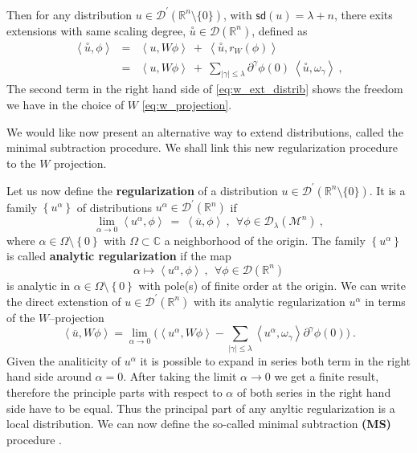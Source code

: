 \documentclass[11pt]{book}
\newcommand{\sd}{\mathsf{sd}}
\newcommand{\abs}[1]{\left|#1\right|}
\newcommand{\sm}[1]{\left\langle#1\right\rangle}
\newcommand{\exte}[1]{\overset{\circ}{#1}}
\newcommand{\Dcal}{\mathcal{D}}
\newcommand{\Mcal}{\mathcal{M}}
\newcommand{\Rbb}{\mathbb{R}}
\theoremstyle{break}
\begin{document}
Then for any distribution $u\in\Dcal^\prime(\Rbb^n\setminus\{0\})$, with $\sd(u) = \lambda +n$, there exits extensions with same scaling degree, $\exte{u} \in \Dcal(\Rbb^n)$, defined as
% 
\begin{eqnarray}
\sm{\exte{u},\phi} &=& \sm{u,W\phi} \ + \ \sm{\exte{u},r_W(\phi)} \nonumber \\
&=& \sm{u,W\phi} \ + \ \sum_{\abs{\gamma}\leq\lambda} \partial^\gamma \phi(0) \ \sm{\exte{u},\omega_\gamma} \ , 
\label{eq:w_ext_distrib}
\end{eqnarray}
%
The second term in the right hand side of \eqref{eq:w_ext_distrib} shows the freedom we have in the choice of $W$ \eqref{eq:w_projection}.


\bigskip


We would like now present an alternative way to extend distributions, called the minimal subtraction procedure. We shall link this new regularization procedure to the $W$ projection.


Let us now define the \textbf{regularization} of a distribution $u \in \Dcal^\prime(\Rbb^n\setminus \{0\})$. It is a family $\left\{ u^{\alpha}\right\}$ of distributions $u^{\alpha}\in\Dcal^\prime(\Rbb^n)$ if
%
\begin{equation*}
\lim_{\alpha \to 0} \sm{u^{\alpha},\phi} \ = \ \sm{\overline{u},\phi} \ , \ \ \forall \phi \in \Dcal_{\lambda}(\Mcal^n) \ , 
\end{equation*}
%
where $\alpha \in \Omega\setminus\left\{ 0\right\}$ with $\Omega\subset\mathbb{C}$ a neighborhood of the origin. The family $\left\{ u^{\alpha}\right\}$ is called \textbf{analytic regularization} if the map 
% 
\begin{equation*}
\alpha \mapsto \sm{u^{\alpha},\phi} \ , \ \ \forall \phi \in \Dcal(\Rbb^n)
\end{equation*}
%
is analytic in $\alpha\in\Omega\setminus\left\{ 0\right\}$ with pole(s) of finite order at the origin. We can write the direct extenstion of $u\in\Dcal^\prime(\Rbb^n)$ with its analytic regularization $u^\alpha$ in terms of the $W$--projection
%
\begin{equation*}
\sm{\overline{u} , W \phi} = \lim_{\alpha \to 0} \bigg( \sm{u^\alpha , W \phi} -  \sum_{\abs{\gamma}\leq\lambda} \sm{ u^\alpha , \omega_\gamma } \partial^\gamma \phi(0) \bigg) \ .
\end{equation*}
% 
Given the analiticity of $u^\alpha$ it is possible to expand in series both term in the right hand side around $\alpha=0$. After taking the limit $\alpha \to 0$ we get a finite result, therefore the principle parts with respect to $\alpha$ of both series in the right hand side have to be equal. Thus the principal part of any anyltic regularization is a local distribution. We can now define the so-called minimal subtraction \textbf{(MS)} procedure \cite{duetsch_dimensional_2014}.
\end{document}
